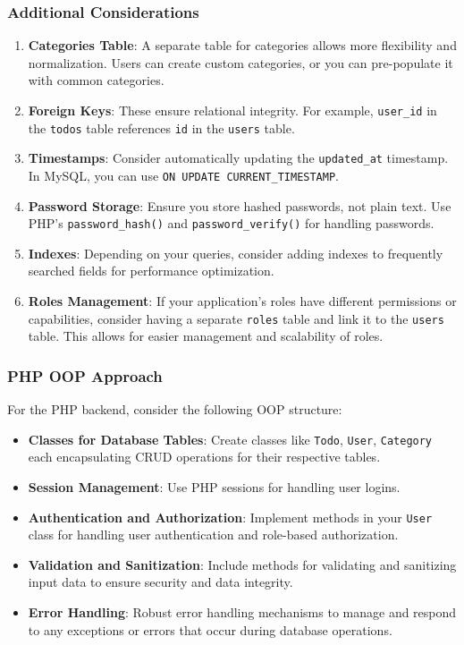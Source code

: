 \documentclass[11pt]{article}
\begin{document}
\subsubsection{Additional Considerations}
\label{sec:orgac8fe7b}
\begin{enumerate}
\item \textbf{Categories Table}: A separate table for categories allows more
flexibility and normalization. Users can create custom categories, or
you can pre-populate it with common categories.

\item \textbf{Foreign Keys}: These ensure relational integrity. For example,
\texttt{user\_id} in the \texttt{todos} table references \texttt{id} in the \texttt{users} table.

\item \textbf{Timestamps}: Consider automatically updating the \texttt{updated\_at}
timestamp. In MySQL, you can use \texttt{ON UPDATE CURRENT\_TIMESTAMP}.

\item \textbf{Password Storage}: Ensure you store hashed passwords, not plain
text. Use PHP's \texttt{password\_hash()} and \texttt{password\_verify()} for
handling passwords.

\item \textbf{Indexes}: Depending on your queries, consider adding indexes to
frequently searched fields for performance optimization.

\item \textbf{Roles Management}: If your application's roles have different
permissions or capabilities, consider having a separate \texttt{roles} table
and link it to the \texttt{users} table. This allows for easier management
and scalability of roles.
\end{enumerate}

\subsubsection{PHP OOP Approach}
\label{sec:org1345282}
For the PHP backend, consider the following OOP structure:

\begin{itemize}
\item \textbf{Classes for Database Tables}: Create classes like \texttt{Todo}, \texttt{User},
\texttt{Category} each encapsulating CRUD operations for their respective
tables.
\item \textbf{Session Management}: Use PHP sessions for handling user logins.
\item \textbf{Authentication and Authorization}: Implement methods in your \texttt{User}
class for handling user authentication and role-based authorization.
\item \textbf{Validation and Sanitization}: Include methods for validating and
sanitizing input data to ensure security and data integrity.
\item \textbf{Error Handling}: Robust error handling mechanisms to manage and
respond to any exceptions or errors that occur during database
operations.
\end{itemize}
\end{document}
